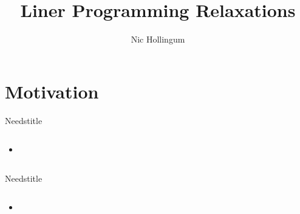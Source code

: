 \documentclass{beamer}
\title[LP Relaxations]{Liner Programming Relaxations}
\author{Nic Hollingum}
\institute{USYD}
\begin{document}
\begin{frame}
\titlepage
\end{frame}

\section{Motivation}

\begin{frame}{Needstitle}
\begin{columns}
\begin{column}{6cm}
\begin{itemize}
	\item 
\end{itemize}
\end{column}
\begin{column}{4cm}
\end{column}
\end{columns}
\end{frame}

\begin{frame}{Needstitle}
\begin{columns}
\begin{column}{6cm}
\begin{itemize}
	\item 
\end{itemize}
\end{column}
\begin{column}{4cm}
\end{column}
\end{columns}
\end{frame}
\end{document}

